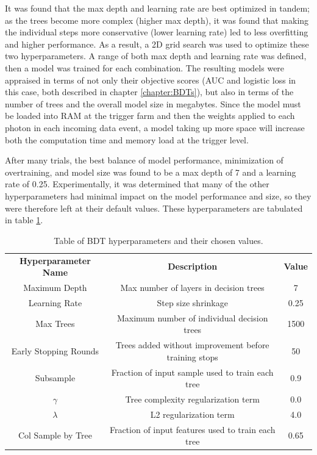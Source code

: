 \documentclass[12pt]{ucsddissertation}
\begin{document}
It was found that the max depth and learning rate are best optimized in tandem; as the trees become more complex (higher max depth), it was found that making the individual steps more conservative (lower learning rate) led to less overfitting and higher performance. As a result, a 2D grid search was used to optimize these two hyperparameters. A range of both max depth and learning rate was defined, then a model was trained for each combination. The resulting models were appraised in terms of not only their objective scores (AUC and logistic loss in this case, both described in chapter \ref{chapter:BDTs}), but also in terms of the number of trees and the overall model size in megabytes. Since the model must be loaded into RAM at the trigger farm and then the weights applied to each photon in each incoming data event, a model taking up more space will increase both the computation time and memory load at the trigger level. 

After many trials, the best balance of model performance, minimization of overtraining, and model size was found to be a max depth of 7 and a learning rate of 0.25. Experimentally, it was determined that many of the other hyperparameters had minimal impact on the model performance and size, so they were therefore left at their default values. These hyperparameters are tabulated in table \ref{tab:HLTHyperparams}.

\begin{table}
	\centering
	\caption{Table of BDT hyperparameters and their chosen values. }
	\label{tab:HLTHyperparams}
	\begin{tabular}{ | c | c | c |} 
		\hline
		\textbf{Hyperparameter Name} & \textbf{Description} & \textbf{Value} \\
		\Xhline{2pt}
	  	Maximum Depth & Max number of layers in decision trees & 7 \\ 
		\hline
		Learning Rate & Step size shrinkage & 0.25 \\ 
		\hline
		Max Trees & Maximum number of individual decision trees & 1500 \\
		\hline
		Early Stopping Rounds & Trees added without improvement before training stops & 50 \\
		\hline
		Subsample & Fraction of input sample used to train each tree & 0.9 \\ 
		\hline
		$\gamma$ & Tree complexity regularization term & 0.0 \\ 
		\hline
		$\lambda$ & L2 regularization term & 4.0 \\ 
		\hline
		Col Sample by Tree & Fraction of input features used to train each tree & 0.65 \\ 
		\hline
	\end{tabular}
\end{table}
\end{document}
